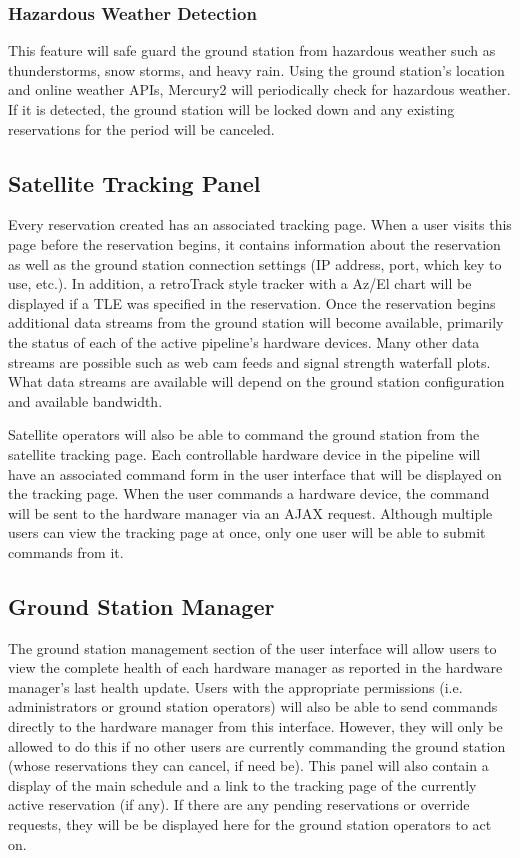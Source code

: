 \documentclass{mxl-design}
\begin{document}
\subsubsection{Hazardous Weather Detection}
This feature will safe guard the ground station from hazardous weather such as thunderstorms, snow storms, and heavy rain. Using the ground station's location and online weather APIs, Mercury2 will periodically check for hazardous weather. If it is detected, the ground station will be locked down and any existing reservations for the period will be canceled. 

\subsection{Satellite Tracking Panel}
\label{sec:tracking_panel}
Every reservation created has an associated tracking page. When a user visits this page before the reservation begins, it contains information about the reservation as well as the ground station connection settings (IP address, port, which key to use, etc.). In addition, a retroTrack style tracker with a Az/El chart will be displayed if a TLE was specified in the reservation. Once the reservation begins additional data streams from the ground station will become available, primarily the status of each of the active pipeline's hardware devices. Many other data streams are possible such as web cam feeds and signal strength waterfall plots. What data streams are available will depend on the ground station configuration and available bandwidth.

Satellite operators will also be able to command the ground station from the satellite tracking page. Each controllable hardware device in the pipeline will have an associated command form in the user interface that will be displayed on the tracking page. When the user commands a hardware device, the command will be sent to the hardware manager via an AJAX request. Although multiple users can view the tracking page at once, only one user will be able to submit commands from it.

\subsection{Ground Station Manager}
\label{sec:ground_station_manager}
The ground station management section of the user interface will allow users to view the complete health of each hardware manager as reported in the hardware manager's last health update. Users with the appropriate permissions (i.e. administrators or ground station operators) will also be able to send commands directly to the hardware manager from this interface. However, they will only be allowed to do this if no other users are currently commanding the ground station (whose reservations they can cancel, if need be). This panel will also contain a display of the main schedule and a link to the tracking page of the currently active reservation (if any). If there are any pending reservations or override requests, they will be be displayed here for the ground station operators to act on.
\end{document}
